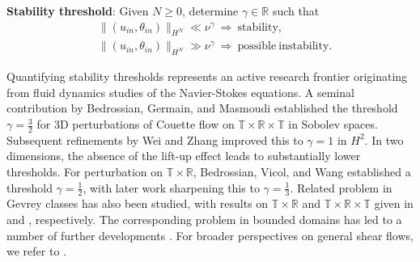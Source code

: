 \documentclass[12pt]{article}
\numberwithin{equation}{section}
\begin{document}
	\textbf{Stability threshold}: Given $N\geq0$, determine $\gamma\in\mathbb{R}$ such that
	\begin{align*}
		&\|(u_{in},\theta_{in})\|_{H^N}\ll\nu^{\gamma}\ \Rightarrow\ \mathrm{stability},\\
		&\|(u_{in},\theta_{in})\|_{H^N}\gg\nu^{\gamma}\ \Rightarrow\ \mathrm{possible \ instability}.
	\end{align*}
	
	Quantifying stability thresholds represents an active research frontier originating from fluid dynamics studies of the Navier-Stokes equations.	
	A seminal contribution by Bedrossian, Germain, and Masmoudi \cite{BGM17} established the threshold $\gamma = \frac{3}{2}$ for 3D perturbations of Couette flow on $\mathbb{T} \times \mathbb{R} \times \mathbb{T}$ in Sobolev spaces. Subsequent refinements by Wei and Zhang \cite{WZ21} improved this to $\gamma = 1$ in $H^2$. In two dimensions, the absence of the lift-up effect leads to substantially lower thresholds. For perturbation on $\mathbb{T} \times \mathbb{R}$, Bedrossian, Vicol, and Wang \cite{BVW18} established a threshold $\gamma = \frac{1}{2}$, with later work \cite{MZ22,WZ23} sharpening this to $\gamma = \frac{1}{3}$. Related problem in Gevrey classes has also been studied, with results on $\mathbb{T}\times\mathbb{R}$ and $\mathbb{T}\times\mathbb{R}\times\mathbb{T}$ given in \cite{BMV16,LMZ25} and \cite{BGM20,BGM22}, respectively. The corresponding problem in bounded domains has led to a number of further developments \cite{CWZ24,CLWZ20,BHIW25,WZ26,BHIW24,BHILW25a}. For broader perspectives on general shear flows, we refer to \cite{LWZ20,C23,AB25,CJWZ25,LLZ25,LSZ26,CEW20}.
	
\end{document}
